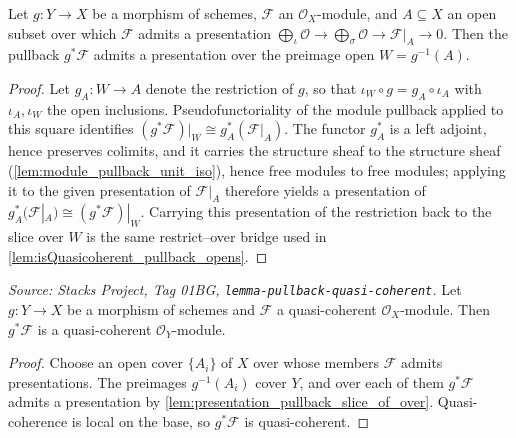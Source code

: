 \begin{lemma}\leanok
  \label{lem:presentation_pullback_slice_of_over}
  Let \(g : Y \to X\) be a morphism of schemes, \(\mathcal{F}\) an \(\mathcal{O}_X\)-module,
  and \(A \subseteq X\) an open subset over which \(\mathcal{F}\) admits a presentation
  \(\bigoplus_{\iota}\mathcal{O} \to \bigoplus_{\sigma}\mathcal{O} \to \mathcal{F}|_A \to 0\).
  Then the pullback \(g^*\mathcal{F}\) admits a presentation over the preimage open
  \(W = g^{-1}(A)\).
\end{lemma}
\begin{proof}\leanok
  Let \(g_A : W \to A\) denote the restriction of \(g\), so that
  \(\iota_W \circ g = g_A \circ \iota_A\) with \(\iota_A, \iota_W\) the open inclusions.
  Pseudofunctoriality of the module pullback applied to this square identifies
  \((g^*\mathcal{F})|_W \cong g_A^*(\mathcal{F}|_A)\). The functor \(g_A^*\) is a left
  adjoint, hence preserves colimits, and it carries the structure sheaf to the structure
  sheaf (\cref{lem:module_pullback_unit_iso}), hence free modules to free modules; applying it to
  the given presentation of \(\mathcal{F}|_A\) therefore yields a presentation of
  \(g_A^*(\mathcal{F}|_A) \cong (g^*\mathcal{F})|_W\). Carrying this presentation of the
  restriction back to the slice over \(W\) is the same restrict--over bridge used in
  \cref{lem:isQuasicoherent_pullback_opens}.
\end{proof}

\begin{lemma}\leanok
  \label{lem:pullback_isQuasicoherent_hom}
  \textit{Source: Stacks Project, Tag 01BG, \texttt{lemma-pullback-quasi-coherent}.}
  Let \(g : Y \to X\) be a morphism of schemes and \(\mathcal{F}\) a quasi-coherent
  \(\mathcal{O}_X\)-module. Then \(g^*\mathcal{F}\) is a quasi-coherent
  \(\mathcal{O}_Y\)-module.
\end{lemma}
\begin{proof}\leanok
  Choose an open cover \(\{A_i\}\) of \(X\) over whose members \(\mathcal{F}\) admits
  presentations. The preimages \(g^{-1}(A_i)\) cover \(Y\), and over each of them
  \(g^*\mathcal{F}\) admits a presentation by
  \cref{lem:presentation_pullback_slice_of_over}. Quasi-coherence is local on the base, so
  \(g^*\mathcal{F}\) is quasi-coherent.
\end{proof}

